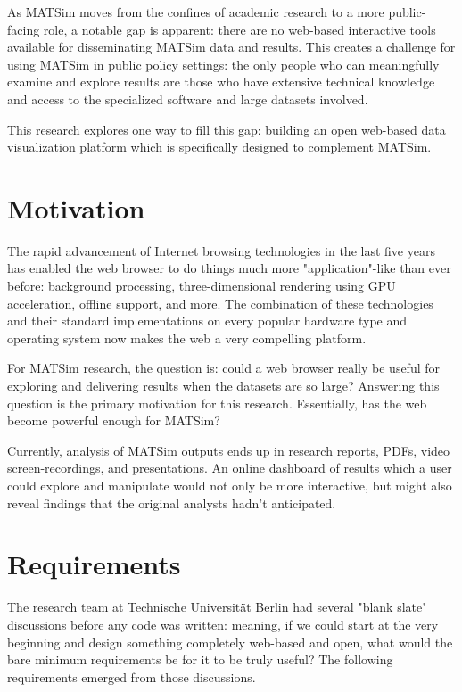 \documentclass[Afour,sageh,times]{sagej}
\begin{document}
As MATSim moves from the confines of academic research to a more
public-facing role, a notable gap is apparent: there are no web-based interactive tools available for disseminating MATSim data and results. This creates a challenge for using MATSim in public policy settings: the only people who can meaningfully examine and explore results are those who have extensive technical knowledge and access to the specialized software and large datasets involved.

This research explores one way to fill this gap: building an open
web-based data visualization platform which is specifically designed
to complement MATSim.

\section{Motivation}

The rapid advancement of Internet browsing technologies in the last
five years has enabled the web browser to do things much more
"application"-like than ever before: background processing,
three-dimensional rendering using GPU acceleration, offline
support, and more. The combination of these technologies and their
standard implementations on every popular hardware type and operating system now makes the web a very compelling platform.

For MATSim research, the question is: could a web browser really
be useful for exploring and delivering results when the datasets
are so large? Answering this question is the primary motivation for
this research. Essentially, has the web become powerful enough for MATSim?

Currently, analysis of MATSim outputs ends up in research reports, PDFs, video screen-recordings, and presentations. An online dashboard of results which a user could explore and manipulate would not only be more interactive, but might also reveal findings that the original analysts hadn't anticipated.

\section{Requirements}
The research team at Technische Universität Berlin had several
"blank slate" discussions before any code was written: meaning,
if we could start at the very beginning and design something completely web-based and open, what would the bare minimum requirements be for it to be truly useful? The following requirements emerged from those discussions.
\end{document}
